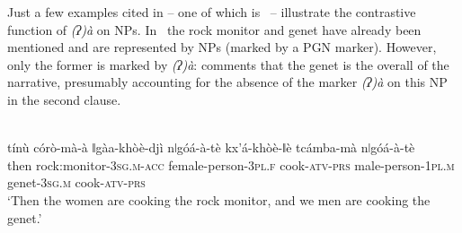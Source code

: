 \documentclass[output=paper]{LSP/langsci}
\begin{document}

Just a few examples cited in \citet{Kilian-Hatz2008Grammar,Kilian-Hatz2013Kxoe} – one of which is~ – illustrate the contrastive function of \textit{(ʔ)à} on  NPs. In~ the rock monitor and genet have already been mentioned and are represented by  NPs (marked by a PGN marker). However, only the former is marked by \textit{(ʔ)à}: \citet[372]{Kilian-Hatz2013Kxoe} comments that the genet is the overall  of the narrative, presumably accounting for the absence of the marker \textit{(ʔ)à} on this NP in the second clause.

\begin{exe}
\ex\label{09-mc-ex:34}
\\
\gll tínù córò-mà-à ǁgàa-khòè-djì nǀgóá-à-tè kx’á-khòè-ǁè tcámba-mà nǀgóá-à-tè \\
then rock:monitor-3\textsc{sg.m}-\textsc{acc} female-person-3\textsc{pl.f} cook-\textsc{atv}-\textsc{prs} male-person-1\textsc{pl.m} genet-3\textsc{sg.m} cook-\textsc{atv}-\textsc{prs}\\
\glt ‘Then the women are cooking the rock monitor, and we men are cooking the genet.’ 
\end{exe}
\end{document}
